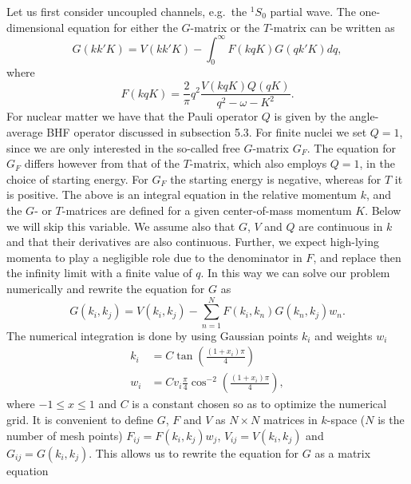 Let us first consider uncoupled channels, e.g.\ the $^1S_0$ partial wave.
The one-dimensional equation for either the $G$-matrix or the $T$-matrix
can be written as 
\begin{equation}
     G(kk'K) = V(kk'K)- \int_0 ^{\infty} F(kqK)G(qk'K)dq,
\end{equation}
where
\begin{equation}
    F(kqK) =\frac{2}{\pi} q^2\frac{V(kqK)Q(qK)}{q^2 - \omega -K^2}.
\end{equation}
For nuclear matter we have that the Pauli operator $Q$ is given by the
angle-average BHF operator discussed in subsection 5.3. For finite nuclei
we set $Q=1$, since we are only interested in the so-called free $G$-matrix
$G_F$. The equation for $G_F$ differs however from that of the $T$-matrix,
which also employs $Q=1$, in the choice of starting energy. For $G_F$ the
starting energy is negative, whereas for $T$ it is positive. The above is 
an integral equation in the relative momentum $k$, and the $G$- or $T$-matrices
are defined for a given center-of-mass momentum $K$. Below we will skip 
this variable. We assume also that $G$, $V$ and $Q$ are continuous in $k$
and that their derivatives are also continuous. Further, we expect high-lying
momenta to play a negligible role due to the denominator in $F$, and 
replace then the infinity limit with a finite value of $q$. In this way we
can solve our problem numerically and rewrite the equation for $G$ as  
\begin{equation} 
\label{eq:numintegral}
   G(k_i,k_j)  =  V(k_i,k_j)- \sum _{n=1} ^N F(k_i,k_n)G(k_n,k_j)w_n.
\end{equation}  
The numerical integration is done by using Gaussian points $k_i$ and weights
$w_i$ 
\begin{eqnarray}  
\label{eq:gaussavb}
k_i & = C \tan(\frac{(1+x_i)\pi }{4}) \\
w_i & = C v_i\frac{\pi}{4} \cos^{-2} (\frac{(1+x_i)\pi }{4}),  \nonumber
\end{eqnarray}                                          
where $-1\leq x \leq 1$ and $C$ is a constant chosen so as to optimize
the numerical grid. It is convenient to define $G$, $F$ and $V$ as $N\times N$
matrices in $k$-space ($N$ is the number of mesh points)
$F_{ij}=F(k_i,k_j)w_j$, $V_{ij}=V(k_i,k_j)$ and
$G_{ij}=G(k_i,k_j)$. This allows us to rewrite the equation for $G$ as a
matrix equation 
